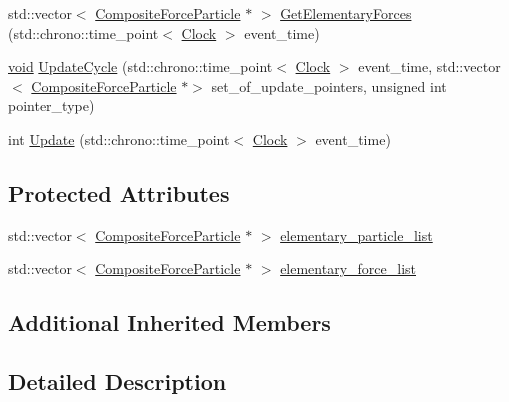 \begin{DoxyCompactItemize}
\item 
std\+::vector$<$ \mbox{\hyperlink{class_composite_force_particle}{Composite\+Force\+Particle}} $\ast$ $>$ \mbox{\hyperlink{class_composite_force_particle_a2e9da0590067cf243c0f2d239f712e7f}{Get\+Elementary\+Forces}} (std\+::chrono\+::time\+\_\+point$<$ \mbox{\hyperlink{universe_8h_a0ef8d951d1ca5ab3cfaf7ab4c7a6fd80}{Clock}} $>$ event\+\_\+time)
\item 
\mbox{\hyperlink{glad_8h_a950fc91edb4504f62f1c577bf4727c29}{void}} \mbox{\hyperlink{class_composite_force_particle_a578d87e48246ef83f39dce070dff541e}{Update\+Cycle}} (std\+::chrono\+::time\+\_\+point$<$ \mbox{\hyperlink{universe_8h_a0ef8d951d1ca5ab3cfaf7ab4c7a6fd80}{Clock}} $>$ event\+\_\+time, std\+::vector$<$ \mbox{\hyperlink{class_composite_force_particle}{Composite\+Force\+Particle}} $\ast$$>$ set\+\_\+of\+\_\+update\+\_\+pointers, unsigned int pointer\+\_\+type)
\item 
int \mbox{\hyperlink{class_composite_force_particle_a69b47aaf17ab6faa396c2f6e6c85b2e3}{Update}} (std\+::chrono\+::time\+\_\+point$<$ \mbox{\hyperlink{universe_8h_a0ef8d951d1ca5ab3cfaf7ab4c7a6fd80}{Clock}} $>$ event\+\_\+time)
\end{DoxyCompactItemize}
\subsection*{Protected Attributes}
\begin{DoxyCompactItemize}
\item 
std\+::vector$<$ \mbox{\hyperlink{class_composite_force_particle}{Composite\+Force\+Particle}} $\ast$ $>$ \mbox{\hyperlink{class_composite_force_particle_a1f5ab59857b8517af69205178f04abe9}{elementary\+\_\+particle\+\_\+list}}
\item 
std\+::vector$<$ \mbox{\hyperlink{class_composite_force_particle}{Composite\+Force\+Particle}} $\ast$ $>$ \mbox{\hyperlink{class_composite_force_particle_a00d5ce181c8d4b1df0d46ff23a8fb1b8}{elementary\+\_\+force\+\_\+list}}
\end{DoxyCompactItemize}
\subsection*{Additional Inherited Members}


\subsection{Detailed Description}



